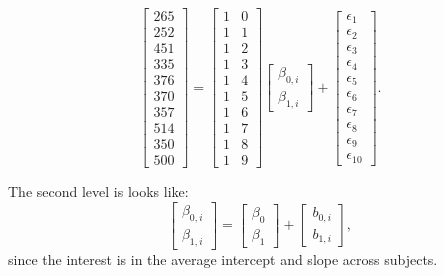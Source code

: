 \documentclass[
]{book}
\begin{document}
\[\left[\begin{array}{c}
265 \\ 252 \\ 451 \\ 335 \\ 376 \\370 \\ 357 \\ 514 \\ 350 \\ 500 \end{array}\right] = \left[\begin{array}{cc}
1 & 0 \\
1 & 1 \\
1 & 2 \\
1 & 3 \\
1 & 4 \\
1 & 5 \\
1 & 6 \\
1& 7 \\
1 & 8 \\
1 & 9 \end{array}\right]\left[\begin{array}{c} \beta_{0, i} \\ \beta_{1, i}  \end{array}\right] + 
\left[\begin{array}{c}
\epsilon_1 \\
\epsilon_2 \\
\epsilon_3 \\
\epsilon_4 \\
\epsilon_5 \\
\epsilon_6 \\
\epsilon_7 \\
\epsilon_8 \\
\epsilon_9 \\
\epsilon_{10} 
\end{array}\right].\]

The second level is looks like: \[\left[\begin{array}{c}\beta_{0,i} \\ \beta_{1,i}\end{array}\right] =\left[\begin{array}{c}\beta_{0} \\ \beta_{1}\end{array}\right] + \left[\begin{array}{c}b_{0,i} \\ b_{1,i}\end{array}\right],\] since the interest is in the average intercept and slope across subjects.
\end{document}
